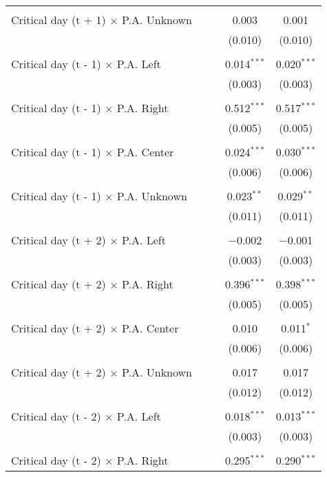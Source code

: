 \documentclass[
]{article}
\begin{document}
\begin{table}[!htbp]
{\begin{tabular}{@{\extracolsep{5pt}}lcccc}
  & & & & \\ 
 Critical day (t + 1) $\times$ P.A. Unknown &  &  & 0.003 & 0.001 \\ 
  &  &  & (0.010) & (0.010) \\ 
  & & & & \\ 
 Critical day (t - 1) $\times$ P.A. Left &  &  & 0.014$^{***}$ & 0.020$^{***}$ \\ 
  &  &  & (0.003) & (0.003) \\ 
  & & & & \\ 
 Critical day (t - 1) $\times$ P.A. Right &  &  & 0.512$^{***}$ & 0.517$^{***}$ \\ 
  &  &  & (0.005) & (0.005) \\ 
  & & & & \\ 
 Critical day (t - 1) $\times$ P.A. Center &  &  & 0.024$^{***}$ & 0.030$^{***}$ \\ 
  &  &  & (0.006) & (0.006) \\ 
  & & & & \\ 
 Critical day (t - 1) $\times$ P.A. Unknown &  &  & 0.023$^{**}$ & 0.029$^{**}$ \\ 
  &  &  & (0.011) & (0.011) \\ 
  & & & & \\ 
 Critical day (t + 2) $\times$ P.A. Left &  &  & $-$0.002 & $-$0.001 \\ 
  &  &  & (0.003) & (0.003) \\ 
  & & & & \\ 
 Critical day (t + 2) $\times$ P.A. Right &  &  & 0.396$^{***}$ & 0.398$^{***}$ \\ 
  &  &  & (0.005) & (0.005) \\ 
  & & & & \\ 
 Critical day (t + 2) $\times$ P.A. Center &  &  & 0.010 & 0.011$^{*}$ \\ 
  &  &  & (0.006) & (0.006) \\ 
  & & & & \\ 
 Critical day (t + 2) $\times$ P.A. Unknown &  &  & 0.017 & 0.017 \\ 
  &  &  & (0.012) & (0.012) \\ 
  & & & & \\ 
 Critical day (t - 2) $\times$ P.A. Left &  &  & 0.018$^{***}$ & 0.013$^{***}$ \\ 
  &  &  & (0.003) & (0.003) \\ 
  & & & & \\ 
 Critical day (t - 2) $\times$ P.A. Right &  &  & 0.295$^{***}$ & 0.290$^{***}$ \\ 

\end{tabular}}
\end{table}
\end{document}

